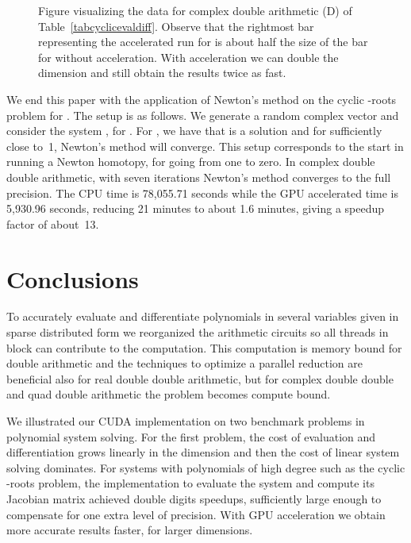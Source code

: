 \documentclass{article}
\begin{document}
\begin{figure}[hbt]
\begin{center}
\caption{Figure visualizing the data 
for complex double arithmetic (D) of Table~\ref{tabcyclicevaldiff}.
Observe that the rightmost bar representing the accelerated run 
for  is about half the size of the bar
for  without acceleration.
With acceleration we can double the dimension and still obtain
the results twice as fast.}
\label{figcyclicevaldiff}
\end{center}
\end{figure}

We end this paper with the application of Newton's method
on the cyclic -roots problem  for .
The setup is as follows.  We generate a random complex vector
 and consider the system
, for .
For , we have that  is a solution
and for  sufficiently close to~1, Newton's method will converge.
This setup corresponds to the start in running a Newton homotopy,
for  going from one to zero.
In complex double double arithmetic, with seven iterations
Newton's method converges to the full precision.
The CPU time is 78,055.71 seconds
while the GPU accelerated time is 5,930.96 seconds,
reducing 21 minutes to about 1.6 minutes,
giving a speedup factor of about~13.

\section{Conclusions}

To accurately evaluate and differentiate polynomials in several variables
given in sparse distributed form we reorganized the arithmetic circuits
so all threads in block can contribute to the computation.
This computation is memory bound for double arithmetic and the
techniques to optimize a parallel reduction are beneficial also
for real double double arithmetic, but for complex double double
and quad double arithmetic the problem becomes compute bound.

We illustrated our CUDA implementation on two benchmark problems
in polynomial system solving.  For the first problem, the cost
of evaluation and differentiation grows linearly in the dimension
and then the cost of linear system solving dominates.
For systems with polynomials of high degree such as the
cyclic -roots problem, the implementation to evaluate the
system and compute its Jacobian matrix achieved double digits speedups,
sufficiently large enough to compensate for one extra level of precision.
With GPU acceleration we obtain more accurate results faster,
for larger dimensions.
\end{document}
